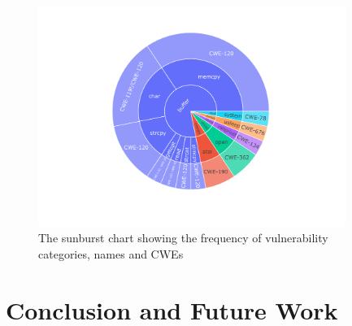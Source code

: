 \documentclass[conference]{IEEEtran}
\begin{document}
  \begin{figure}[h!]
    \centering
    \includegraphics[width=10cm]{../figure/vul_sunburst.pdf}
    \vspace*{-1.5ex}
    \caption{The sunburst chart showing the frequency of vulnerability categories, names and CWEs}
    \label{fig:lcurve-iot}
  \end{figure}


\section{Conclusion and Future Work}
\label{conclusion}



\printbibliography
\end{document}
